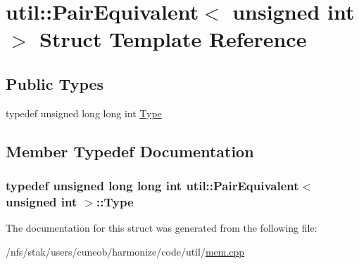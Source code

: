 \hypertarget{structutil_1_1PairEquivalent_3_01unsigned_01int_01_4}{\section{util\-:\-:Pair\-Equivalent$<$ unsigned int $>$ Struct Template Reference}
\label{structutil_1_1PairEquivalent_3_01unsigned_01int_01_4}
}
\subsection*{Public Types}
\begin{DoxyCompactItemize}
\item 
typedef unsigned long long int \hyperlink{structutil_1_1PairEquivalent_3_01unsigned_01int_01_4_aa2e6ef1db9667fb84cedc296383551bd}{Type}
\end{DoxyCompactItemize}


\subsection{Member Typedef Documentation}
\hypertarget{structutil_1_1PairEquivalent_3_01unsigned_01int_01_4_aa2e6ef1db9667fb84cedc296383551bd}{
\subsubsection[{Type}]{\setlength{\rightskip}{0pt plus 5cm}typedef unsigned long long int {\bf util\-::\-Pair\-Equivalent}$<$ unsigned int $>$\-::{\bf Type}}}\label{structutil_1_1PairEquivalent_3_01unsigned_01int_01_4_aa2e6ef1db9667fb84cedc296383551bd}


The documentation for this struct was generated from the following file\-:\begin{DoxyCompactItemize}
\item 
/nfs/stak/users/cuneob/harmonize/code/util/\hyperlink{mem_8cpp}{mem.\-cpp}\end{DoxyCompactItemize}
